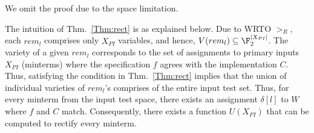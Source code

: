 
\begin{Proof}
We omit the proof due to the space limitation. 
\end{Proof}

The intuition of Thm.~\ref{Thm:rect} is as explained below. 
Due to WRTO $>_R$, each $rem_l$ comprises only $X_{PI}$ variables, and hence,
 $V(rem_l) \subseteq \F_{2}^{|X_{PI}|}$. The variety of a given $rem_l$ 
 corresponds to the set of assignments to primary inputs $X_{PI}$ (minterms) where
 the specification $f$ agrees with the implementation $C$. Thus, satisfying the 
 condition in Thm.~\ref{Thm:rect} implies that the union of individual varieties of 
 $rem_l$'s comprises of the entire input test set. Thus, for every minterm from
 the input test space, there exists an assignment $\delta[l]$ to $W$ where $f$ and $C$ match. 
 Consequently, there exists a function $U(X_{PI})$ that can be computed to rectify every minterm.



